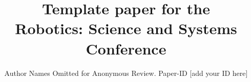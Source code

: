 \documentclass[conference]{IEEEtran}
\begin{document}
\title{Template paper for the \\Robotics: Science and Systems Conference}

\author{Author Names Omitted for Anonymous Review. Paper-ID [add your ID here]}





% 


\maketitle
\end{document}
